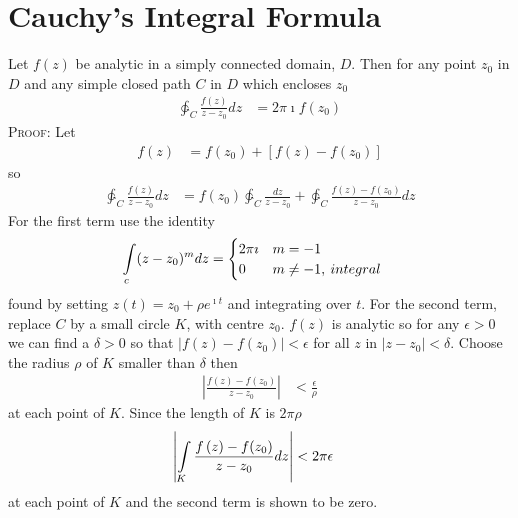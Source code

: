 \documentclass[a4paper,twoside,10pt,english]{report}
\begin{document}
\section{\label{app:Cauchys-Integral-Formula}Cauchy's Integral 
Formula}
Let $f\left(z\right)$ be analytic in a simply connected domain, $D$. Then for
any point $z_{0}$ in $D$ and any simple closed path $C$ in $D$
which encloses $z_{0}$
\begin{align*}
\ointctrclockwise_{C}\frac{f\left(z\right)}{z-z_{0}}dz & = 2\pi\imath f(z_{0})
\end{align*}
\textsc{Proof:}
Let
\begin{align*}
f\left(z\right) & = f(z_{0})+\left[f\left(z\right)-f(z_{0})\right]
\end{align*}
so
\begin{align*}
\ointctrclockwise_{C}\frac{f\left(z\right)}{z-z_{0}}dz & = f(z_{0})\ointctrclockwise_{C}\frac{dz}{z-z_{0}}+\ointctrclockwise_{C}\frac{f\left(z\right)-f(z_{0})}{z-z_{0}}dz
\end{align*}
For the first term use the identity
\begin{align*}
\intop_{c}(z-z_{0})^{m}dz & = \begin{cases}
2\pi\imath & m=-1\\
0 & m\neq-1,\: integral
\end{cases}
\end{align*}
found by setting $z(t)=z_{0}+\rho e^{\imath t}$ and integrating over
$t$. For the second term, replace $C$ by a small circle $K$, with
centre $z_{0}$. $f\left(z\right)$ is analytic so for any $\epsilon>0$ we can
find a $\delta>0$ so that $\left|f\left(z\right)-f(z_{0})\right|<\epsilon$
for all $z$ in $\left|z-z_{0}\right|<\delta$. Choose the radius
$\rho$ of $K$ smaller than $\delta$ then
\begin{align*}
\left|\frac{f\left(z\right)-f(z_{0})}{z-z_{0}}\right| & < \frac{\epsilon}{\rho}
\end{align*}
at each point of $K$. Since the length of $K$ is $2\pi\rho$
\begin{align*}
\left|\intop_{K}\frac{f\left(z\right)-f(z_{0})}{z-z_{0}}dz\right| & < 2\pi\epsilon
\end{align*}
at each point of $K$ and the second term is shown to be zero.
\end{document}
